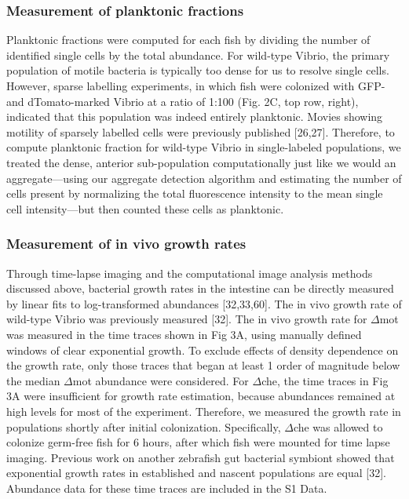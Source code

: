 \subsubsection{Measurement of planktonic fractions}
Planktonic fractions were computed for each fish by dividing the number of identified single cells by the total abundance. For wild-type Vibrio, the primary population of motile bacteria is typically too dense for us to resolve single cells. However, sparse labelling experiments, in which fish were colonized with GFP- and dTomato-marked Vibrio at a ratio of 1:100 (Fig. 2C, top row, right), indicated that this population was indeed entirely planktonic. Movies showing motility of sparsely labelled cells were previously published [26,27]. Therefore, to compute planktonic fraction for wild-type Vibrio in single-labeled populations, we treated the dense, anterior sub-population computationally just like we would an aggregate—using our aggregate detection algorithm and estimating the number of cells present by normalizing the total fluorescence intensity to the mean single cell intensity—but then counted these cells as planktonic.

\subsubsection{Measurement of in vivo growth rates}
Through time-lapse imaging and the computational image analysis methods discussed above, bacterial growth rates in the intestine can be directly measured by linear fits to log-transformed abundances [32,33,60]. The in vivo growth rate of wild-type Vibrio was previously measured [32]. The in vivo growth rate for $\Delta$mot was measured in the time traces shown in Fig 3A, using manually defined windows of clear exponential growth. To exclude effects of density dependence on the growth rate, only those traces that began at least 1 order of magnitude below the median $\Delta$mot abundance were considered. For $\Delta$che, the time traces in Fig 3A were insufficient for growth rate estimation, because abundances remained at high levels for most of the experiment. Therefore, we measured the growth rate in populations shortly after initial colonization. Specifically, $\Delta$che was allowed to colonize germ-free fish for 6 hours, after which fish were mounted for time lapse imaging. Previous work on another zebrafish gut bacterial symbiont showed that exponential growth rates in established and nascent populations are equal [32]. Abundance data for these time traces are included in the S1 Data.

